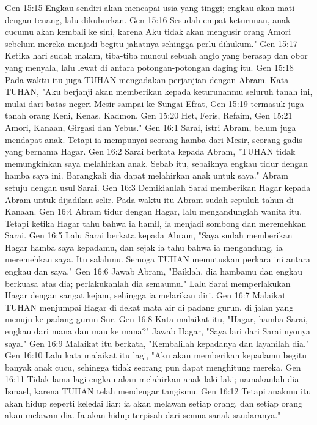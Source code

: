 Gen 15:15  Engkau sendiri akan mencapai usia yang tinggi; engkau akan mati dengan tenang, lalu dikuburkan.
Gen 15:16  Sesudah empat keturunan, anak cucumu akan kembali ke sini, karena Aku tidak akan mengusir orang Amori sebelum mereka menjadi begitu jahatnya sehingga perlu dihukum."
Gen 15:17  Ketika hari sudah malam, tiba-tiba muncul sebuah anglo yang berasap dan obor yang menyala, lalu lewat di antara potongan-potongan daging itu.
Gen 15:18  Pada waktu itu juga TUHAN mengadakan perjanjian dengan Abram. Kata TUHAN, "Aku berjanji akan memberikan kepada keturunanmu seluruh tanah ini, mulai dari batas negeri Mesir sampai ke Sungai Efrat,
Gen 15:19  termasuk juga tanah orang Keni, Kenas, Kadmon,
Gen 15:20  Het, Feris, Refaim,
Gen 15:21  Amori, Kanaan, Girgasi dan Yebus."
Gen 16:1  Sarai, istri Abram, belum juga mendapat anak. Tetapi ia mempunyai seorang hamba dari Mesir, seorang gadis yang bernama Hagar.
Gen 16:2  Sarai berkata kepada Abram, "TUHAN tidak memungkinkan saya melahirkan anak. Sebab itu, sebaiknya engkau tidur dengan hamba saya ini. Barangkali dia dapat melahirkan anak untuk saya." Abram setuju dengan usul Sarai.
Gen 16:3  Demikianlah Sarai memberikan Hagar kepada Abram untuk dijadikan selir. Pada waktu itu Abram sudah sepuluh tahun di Kanaan.
Gen 16:4  Abram tidur dengan Hagar, lalu mengandunglah wanita itu. Tetapi ketika Hagar tahu bahwa ia hamil, ia menjadi sombong dan meremehkan Sarai.
Gen 16:5  Lalu Sarai berkata kepada Abram, "Saya sudah memberikan Hagar hamba saya kepadamu, dan sejak ia tahu bahwa ia mengandung, ia meremehkan saya. Itu salahmu. Semoga TUHAN memutuskan perkara ini antara engkau dan saya."
Gen 16:6  Jawab Abram, "Baiklah, dia hambamu dan engkau berkuasa atas dia; perlakukanlah dia semaumu." Lalu Sarai memperlakukan Hagar dengan sangat kejam, sehingga ia melarikan diri.
Gen 16:7  Malaikat TUHAN menjumpai Hagar di dekat mata air di padang gurun, di jalan yang menuju ke padang gurun Sur.
Gen 16:8  Kata malaikat itu, "Hagar, hamba Sarai, engkau dari mana dan mau ke mana?" Jawab Hagar, "Saya lari dari Sarai nyonya saya."
Gen 16:9  Malaikat itu berkata, "Kembalilah kepadanya dan layanilah dia."
Gen 16:10  Lalu kata malaikat itu lagi, "Aku akan memberikan kepadamu begitu banyak anak cucu, sehingga tidak seorang pun dapat menghitung mereka.
Gen 16:11  Tidak lama lagi engkau akan melahirkan anak laki-laki; namakanlah dia Ismael, karena TUHAN telah mendengar tangismu.
Gen 16:12  Tetapi anakmu itu akan hidup seperti keledai liar; ia akan melawan setiap orang, dan setiap orang akan melawan dia. Ia akan hidup terpisah dari semua sanak saudaranya."
